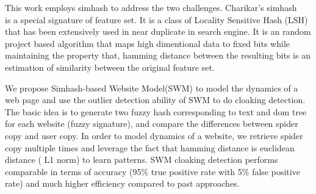 
This work employs simhash to address the two challenges.
Charikar's simhash ~\cite{charikar2002similarity} is a special signature of feature set. 
It is a class of Locality Sensitive Hash (LSH) that has been extensively used in
near duplicate in search engine.
It is an random project based algorithm that maps high dimentional data to fixed bits while
maintaining the property that, hamming distance between the resulting bits is an
estimation of similarity between the original feature set.

%
We propose Simhash-based Website Model(SWM) to model the dynamics of a
web page and use the outlier detection ability of SWM to do cloaking detection.
The basic idea is to generate two fuzzy hash corresponding to text and dom tree
for each website (fuzzy signature), and compare the differences between spider copy and user copy.
In order to model dynamics of a website, we retrieve spider copy multiple
times and leverage the fact that hamming distance is euclidean distance (
L1 norm) to learn patterns.
SWM cloaking detection performs comparable in terms of accuracy (95\% true positive
rate with 5\% false positive rate) and much higher efficiency compared to past
approaches. 

